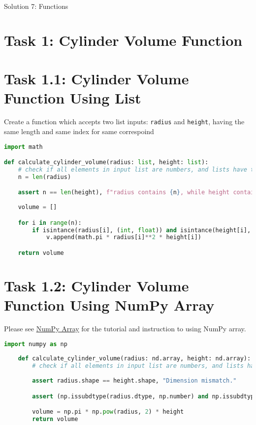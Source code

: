 \documentclass[11pt]{article}
\begin{document}
\begin{center}
    \Large{Solution 7: Functions}
\end{center}

\section*{Task 1: Cylinder Volume Function}

\section*{Task 1.1: Cylinder Volume Function Using List}
Create a function which accepts two list inputs: \texttt{radius} and \texttt{height}, having the same length and same index for same correspoind

\begin{lstlisting}[language=Python]
import math

def calculate_cylinder_volume(radius: list, height: list):
    # check if all elements in input list are numbers, and lists have the same length
    n = len(radius)

    assert n == len(height), f"radius contains {n}, while height contains {height}. Dimension mismatch."
    
    volume = []

    for i in range(n):
        if isintance(radius[i], (int, float)) and isintance(height[i], (int, float)):
            v.append(math.pi * radius[i]**2 * height[i])

    return volume
\end{lstlisting}

\section*{Task 1.2: Cylinder Volume Function Using NumPy Array}
Please see \href{https://numpy.org/doc/stable/user/absolute_beginners.html}{NumPy Array} for the tutorial and instruction to using NumPy array.

\begin{lstlisting}[language=Python]
    import numpy as np
    
    def calculate_cylinder_volume(radius: nd.array, height: nd.array):
        # check if all elements in input list are numbers, and lists have the same length
        
        assert radius.shape == height.shape, "Dimension mismatch."

        assert (np.issubdtype(radius.dtype, np.number) and np.issubdtype(height.dtype, np.number)), "Some elements are not numbers"

        volume = np.pi * np.pow(radius, 2) * height
        return volume
    \end{lstlisting}
    
\end{document}
